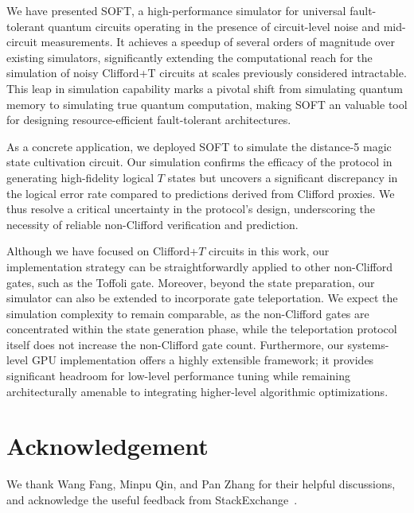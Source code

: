 \documentclass[10pt,conference]{IEEEtran}
\begin{document}
We have presented SOFT, a high-performance simulator for universal fault-tolerant quantum circuits operating in the presence of circuit-level noise and mid-circuit measurements. 
It achieves a speedup of several orders of magnitude over existing simulators,
significantly extending the computational reach for the simulation of noisy Clifford+T circuits at scales previously considered intractable. 
This leap in simulation capability marks a pivotal shift from simulating quantum memory to simulating true quantum computation, making SOFT an valuable tool for designing resource-efficient fault-tolerant architectures.

As a concrete application, we deployed SOFT to simulate the distance-5 magic state cultivation circuit. 
Our simulation confirms the efficacy of the protocol in generating high-fidelity logical $T$ states but uncovers a significant discrepancy in the logical error rate compared to predictions derived from Clifford proxies. 
We thus resolve a critical uncertainty in the protocol's design, underscoring the necessity of reliable non-Clifford verification and prediction.

Although we have focused on Clifford+$T$ circuits in this work, our implementation strategy can be straightforwardly applied to other non-Clifford gates, such as the Toffoli gate. 
Moreover, beyond the state preparation, our simulator can also be extended to incorporate gate teleportation. We expect the simulation complexity to remain comparable, as the non-Clifford gates are concentrated within the state generation phase, while the teleportation protocol itself does not increase the non-Clifford gate count. 
Furthermore, our systems-level GPU implementation offers a highly extensible framework; it provides significant headroom for low-level performance tuning while remaining architecturally amenable to integrating higher-level algorithmic optimizations.

\section*{Acknowledgement}
We thank Wang Fang, Minpu Qin, and Pan Zhang for their helpful discussions, and acknowledge the useful feedback from StackExchange~\cite{stackEx}.



\end{document}
